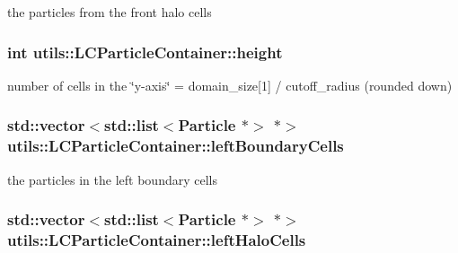 the particles from the front halo cells \hypertarget{classutils_1_1LCParticleContainer_a4f1ca4e9e040fc64a5e17a60673dd669}{
\subsubsection[{height}]{\setlength{\rightskip}{0pt plus 5cm}int utils\-::\-L\-C\-Particle\-Container\-::height\hspace{0.3cm}{\ttfamily [private]}}}\label{classutils_1_1LCParticleContainer_a4f1ca4e9e040fc64a5e17a60673dd669}
number of cells in the \char`\"{}y-\/axis\char`\"{} = domain\-\_\-size\mbox{[}1\mbox{]} / cutoff\-\_\-radius (rounded down) \hypertarget{classutils_1_1LCParticleContainer_a9ade06cd7e76d57770ad62900200a63b}{
\subsubsection[{left\-Boundary\-Cells}]{\setlength{\rightskip}{0pt plus 5cm}std\-::vector$<$std\-::list$<${\bf Particle} $\ast$$>$ $\ast$$>$ utils\-::\-L\-C\-Particle\-Container\-::left\-Boundary\-Cells\hspace{0.3cm}{\ttfamily [private]}}}\label{classutils_1_1LCParticleContainer_a9ade06cd7e76d57770ad62900200a63b}
the particles in the left boundary cells \hypertarget{classutils_1_1LCParticleContainer_a07197daadd51dcbb52f767e2dad0f68f}{
\subsubsection[{left\-Halo\-Cells}]{\setlength{\rightskip}{0pt plus 5cm}std\-::vector$<$std\-::list$<${\bf Particle} $\ast$$>$ $\ast$$>$ utils\-::\-L\-C\-Particle\-Container\-::left\-Halo\-Cells\hspace{0.3cm}{\ttfamily [private]}}}\label{classutils_1_1LCParticleContainer_a07197daadd51dcbb52f767e2dad0f68f}
